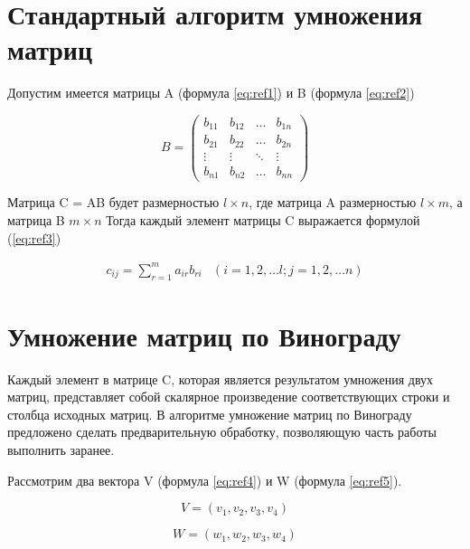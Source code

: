 \section{Стандартный алгоритм умножения матриц}

Допустим имеется матрицы A (формула \ref{eq:ref1}) и B (формула \ref{eq:ref2})

\begin{equation}
	B = \left(
	\begin{array}{cccc}
			b_{11} & b_{12} & \ldots & b_{1n} \\
			b_{21} & b_{22} & \ldots & b_{2n} \\
			\vdots & \vdots & \ddots & \vdots \\
			b_{n1} & b_{n2} & \ldots & b_{nn}
		\end{array}
	\right)
	\label{eq:ref2}
\end{equation}

Матрица C = AB будет размерностью $l \times n$, 
где матрица A размерностью $l \times m$, а матрица B $m \times n$
Тогда каждый элемент матрицы C выражается формулой (\ref{eq:ref3})

\begin{equation}
	\begin{array}{cc}
		c_{ij} = \sum\limits_{r=1}^m a_{ir}b_{ri} & (i=1,2,\dots l; j=1,2,\dots n)
	\end{array}
	\label{eq:ref3}
\end{equation}

\section{Умножение матриц по Винограду}

Каждый элемент в матрице C, которая является результатом умножения двух матриц,
представляет собой скалярное произведение соответствующих строки и столбца исходных матриц. 
В алгоритме умножение матриц по Винограду предложено сделать предварительную обработку,
позволяющую часть работы выполнить заранее.

Рассмотрим два вектора V (формула \ref{eq:ref4}) и W (формула \ref{eq:ref5}).

\begin{equation}
	V = (v_1, v_2, v_3, v_4)
	\label{eq:ref4}
\end{equation}

\begin{equation}
	W = (w_1, w_2, w_3, w_4)
	\label{eq:ref5}
\end{equation}

